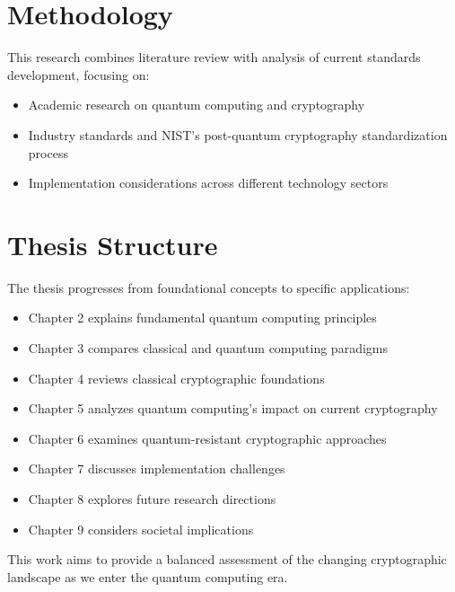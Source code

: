 \section{Methodology}

This research combines literature review with analysis of current standards development, focusing on:
\begin{itemize}
    \item Academic research on quantum computing and cryptography
    \item Industry standards and NIST's post-quantum cryptography standardization process
    \item Implementation considerations across different technology sectors
\end{itemize}

\section{Thesis Structure}

The thesis progresses from foundational concepts to specific applications:
\begin{itemize}
    \item Chapter 2 explains fundamental quantum computing principles
    \item Chapter 3 compares classical and quantum computing paradigms
    \item Chapter 4 reviews classical cryptographic foundations
    \item Chapter 5 analyzes quantum computing's impact on current cryptography
    \item Chapter 6 examines quantum-resistant cryptographic approaches
    \item Chapter 7 discusses implementation challenges
    \item Chapter 8 explores future research directions
    \item Chapter 9 considers societal implications
\end{itemize}

This work aims to provide a balanced assessment of the changing cryptographic landscape as we enter the quantum computing era.